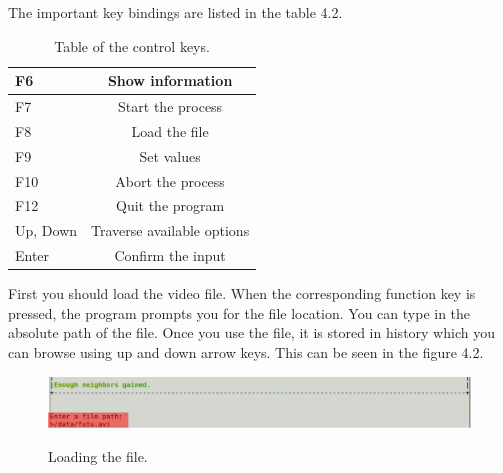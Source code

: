 The important key bindings are listed in the table 4.2.
\begin{table}[h]
\begin{center}
 \begin{tabular}{ | l | c |}
   \hline
   F6 & Show information \\ \hline
   F7 & Start the process \\ \hline
   F8 & Load the file \\ \hline
   F9 & Set values \\ \hline
   F10 & Abort the process \\ \hline
   F12 & Quit the program \\ \hline
   Up, Down & Traverse available options \\ \hline
   Enter & Confirm the input \\
 	\hline
 \end{tabular}
 \caption{Table of the control keys.}
 \end{center}
\end{table}

First you should load the video file. When the corresponding function key is pressed, the program prompts you for the file location. You can type in the absolute path of the file. Once you use the file, it is stored in history which you can browse using up and down arrow keys. This can be seen in the figure 4.2.
\begin{figure}[h]
\begin{center}
\includegraphics[scale=0.35]{./img/loading.pdf}
\label{loading-files}
\caption{Loading the file.}
\end{center}
\end{figure}

